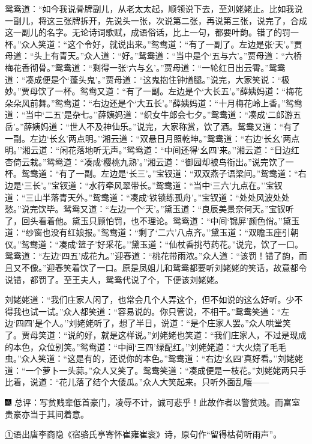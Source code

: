鸳鸯道：``如今我说骨牌副儿，从老太太起，顺领说下去，至刘姥姥止。比如我说一副儿，将这三张牌拆开，先说头一张，次说第二张，再说第三张，说完了，合成这一副儿的名字。无论诗词歌赋，成语俗话，比上一句，都要叶韵。错了的罚一杯。''众人笑道：``这个令好，就说出来。''鸳鸯道：``有了一副了。左边是张`天'。''贾母道：``头上有青天。''众人道：``好。''鸳鸯道：``当中是个`五与六'。''贾母道：``六桥梅花香彻骨。''鸳鸯道：``剩得一张`六与幺'。''贾母道：``一轮红日出云霄。''鸳鸯道：``凑成便是个`蓬头鬼'。''贾母道：``这鬼抱住钟馗腿。''说完，大家笑说：``极妙。''贾母饮了一杯。鸳鸯又道：``有了一副。左边是个`大长五'。''薛姨妈道：``梅花朵朵风前舞。''鸳鸯道：``右边还是个`大五长'。''薛姨妈道：``十月梅花岭上香。''鸳鸯道：``当中`二五'是杂七。''薛姨妈道：``织女牛郎会七夕。''鸳鸯道：``凑成`二郎游五岳'。''薛姨妈道：``世人不及神仙乐。''说完，大家称赏，饮了酒。鸳鸯又道：``有了一副。左边`长幺'两点明。''湘云道：``双悬日月照乾坤。''鸳鸯道：``右边`长幺'两点明。''湘云道：``闲花落地听无声。''鸳鸯道：``中间还得`幺四'来。''湘云道：``日边红杏倚云栽。''鸳鸯道：``凑成`樱桃九熟'。''湘云道：``御园却被鸟衔出。''说完饮了一杯。鸳鸯道：``有了一副。左边是`长三'。''宝钗道：``双双燕子语梁间。''鸳鸯道：``右边是`三长'。''宝钗道：``水荇牵风翠带长。''鸳鸯道：``当中`三六'九点在。''宝钗道：``三山半落青天外。''鸳鸯道：``凑成`铁锁练孤舟'。''宝钗道：``处处风波处处愁。''说完饮毕。鸳鸯又道：``左边一个`天'。''黛玉道：``良辰美景奈何天。''宝钗听了，回头看着他。黛玉只顾怕罚，也不理论。鸳鸯道：``中间`锦屏'颜色俏。''黛玉道：``纱窗也没有红娘报。''鸳鸯道：``剩了`二六'八点齐。''黛玉道：``双瞻玉座引朝仪。''鸳鸯道：``凑成`篮子'好采花。''黛玉道：``仙杖香挑芍药花。''说完，饮了一口。鸳鸯道：``左边`四五'成花九。''迎春道：``桃花带雨浓。''众人道：``该罚！错了韵，而且又不像。''迎春笑着饮了一口。原是凤姐儿和鸳鸯都要听刘姥姥的笑话，故意都令说错，都罚了。至王夫人，鸳鸯代说了个，下便该刘姥姥。

刘姥姥道：``我们庄家人闲了，也常会几个人弄这个，但不如说的这么好听。少不得我也试一试。''众人都笑道：``容易说的。你只管说，不相干。''鸳鸯笑道：``左边`四四'是个人。''刘姥姥听了，想了半日，说道：``是个庄家人罢。''众人哄堂笑了。贾母笑道：``说的好，就是这样说。''刘姥姥也笑道：``我们庄家人，不过是现成的本色，众位别笑。''鸳鸯道：``中间`三四'绿配红。''刘姥姥道：``大火烧了毛毛虫。''众人笑道：``这是有的，还说你的本色。''鸳鸯道：``右边`幺四'真好看。''刘姥姥道：``一个萝卜一头蒜。''众人又笑了。鸳鸯笑道：``凑成便是一枝花。''刘姥姥两只手比着，说道：``花儿落了结个大倭瓜。''众人大笑起来。只听外面乱嚷------

{\includegraphics[width=3mm]{../Images/00005}  \kaishu 总评：写贫贱辈低首豪门，凌辱不计，诚可悲乎！此故作者以警贫贱。而富室贵豪亦当于其间着意。}

{\href{../Text/part0044_split_000.html\#navto_1_a}{①}语出唐李商隐《宿骆氏亭寄怀崔雍崔衮》诗，原句作``留得枯荷听雨声''。}
